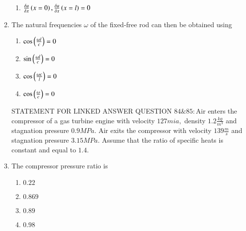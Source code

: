 \documentclass[journal]{IEEEtran}
\begin{document}
\begin{enumerate}
\begin{enumerate}
      \item $\frac{\delta u}{\delta x}\left(x=0\right),\frac{\delta u}{\delta x}\left(x=l\right)=0$
    \end{enumerate}
    \item The natural frequencies $\omega$ of the fixed-free rod can then be obtained using
    \begin{enumerate}
        \item $\cos\left(\frac{\omega l}{c}\right)=0$
        \item $\sin\left(\frac{\omega l}{c}\right)=0$
        \item $\cos\left(\frac{\omega c}{l}\right)=0$
        \item $\cos\left(\frac{\omega }{c}\right)=0$
    \end{enumerate}
    STATEMENT FOR LINKED ANSWER QUESTION $84\&85:$Air enters the compressor of a gas turbine engine with velocity $127 mia,$ density $1.2 \frac{kg}{m^3}$ and stagnation pressure $0.9 MPa.$ Air exits the compressor with velocity $139 \frac{m}{s}$ and stagnation pressure $3.15 MPa.$ Assume that the ratio of specific heats is constant and equal to $1.4.$
    \item The compressor pressure ratio is
    \begin{enumerate}
        \item $0.22$
        \item $0.869$
        \item $0.89$
        \item $0.98$
    \end{enumerate}
    
\end{enumerate}
\end{document}
